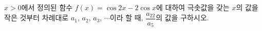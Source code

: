 $x>0$에서 정의된 함수 $f(x)=\cos 2x-2\cos x$에 대하여 극솟값을 갖는 $x$의 값을 작은 것부터 차례대로 $a_1$, $a_2$, $a_3$, $\cdots$이라 할 때, $\dfrac{a_{22}}{a_5}$의 값을 구하시오.
